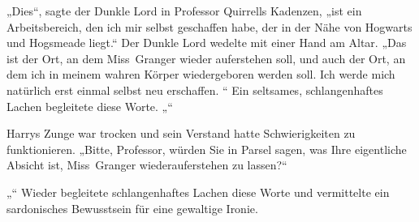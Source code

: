 „Dies“, sagte der Dunkle Lord in Professor Quirrells Kadenzen, „ist ein Arbeitsbereich, den ich mir selbst geschaffen habe, der in der Nähe von Hogwarts und Hogsmeade liegt.“
Der Dunkle Lord wedelte mit einer Hand am Altar.
„Das ist der Ort, an dem Miss~Granger wieder auferstehen soll, und auch der Ort, an dem ich in meinem wahren Körper wiedergeboren werden soll. Ich werde mich natürlich erst einmal selbst neu erschaffen. “
Ein seltsames, schlangenhaftes Lachen begleitete diese Worte.
„“

Harrys Zunge war trocken und sein Verstand hatte Schwierigkeiten zu funktionieren.
„Bitte, Professor, würden Sie in Parsel sagen, was Ihre eigentliche Absicht ist, Miss~Granger wiederauferstehen zu lassen?“

„“ Wieder begleitete schlangenhaftes Lachen diese Worte und vermittelte ein sardonisches Bewusstsein für eine gewaltige Ironie.


